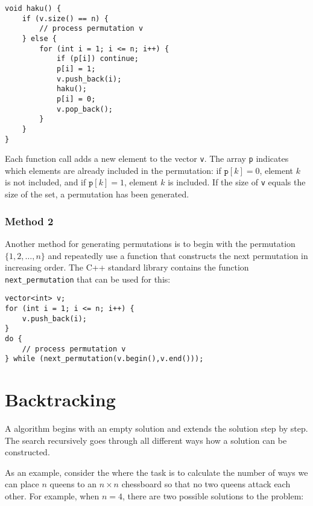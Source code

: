 \begin{lstlisting}
void haku() {
    if (v.size() == n) {
        // process permutation v
    } else {
        for (int i = 1; i <= n; i++) {
            if (p[i]) continue;
            p[i] = 1;
            v.push_back(i);
            haku();
            p[i] = 0;
            v.pop_back();
        }
    }
}
\end{lstlisting}

Each function call adds a new element to
the vector \texttt{v}.
The array \texttt{p} indicates which
elements are already included in the permutation:
if $\texttt{p}[k]=0$, element $k$ is not included,
and if $\texttt{p}[k]=1$, element $k$ is included.
If the size of \texttt{v} equals the size of the set,
a permutation has been generated.

\subsubsection{Method 2}


Another method for generating permutations
is to begin with the permutation
$\{1,2,\ldots,n\}$ and repeatedly
use a function that constructs the next permutation
in increasing order.
The C++ standard library contains the function
\texttt{next\_permutation} that can be used for this:

\begin{lstlisting}
vector<int> v;
for (int i = 1; i <= n; i++) {
    v.push_back(i);
}
do {
    // process permutation v
} while (next_permutation(v.begin(),v.end()));
\end{lstlisting}

\section{Backtracking}


A  algorithm
begins with an empty solution
and extends the solution step by step.
The search recursively
goes through all different ways how
a solution can be constructed.


As an example, consider the 
where the task is to calculate the number
of ways we can place $n$ queens to
an $n \times n$ chessboard so that
no two queens attack each other.
For example, when $n=4$,
there are two possible solutions to the problem:

